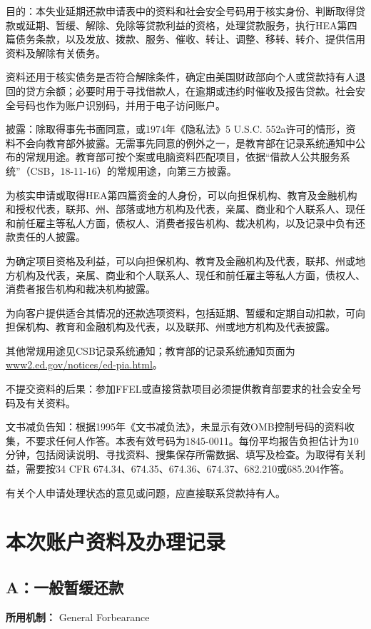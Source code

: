 \documentclass[UTF8,fontset=none,11pt,a4paper]{ctexart}
\begin{document}
目的：本失业延期还款申请表中的资料和社会安全号码用于核实身份、判断取得贷款或延期、暂缓、解除、免除等贷款利益的资格，处理贷款服务，执行HEA第四篇债务条款，以及发放、拨款、服务、催收、转让、调整、移转、转介、提供信用资料及解除有关债务。


资料还用于核实债务是否符合解除条件，确定由美国财政部向个人或贷款持有人退回的贷方余额；必要时用于寻找借款人，在逾期或违约时催收及报告贷款。社会安全号码也作为账户识别码，并用于电子访问账户。


披露：除取得事先书面同意，或1974年《隐私法》5 U.S.C. 552a许可的情形，资料不会向教育部外披露。无需事先同意的例外之一，是教育部在记录系统通知中公布的常规用途。教育部可按个案或电脑资料匹配项目，依据“借款人公共服务系统”（CSB，18-11-16）的常规用途，向第三方披露。


为核实申请或取得HEA第四篇资金的人身份，可以向担保机构、教育及金融机构和授权代表，联邦、州、部落或地方机构及代表，亲属、商业和个人联系人、现任和前任雇主等私人方面，债权人、消费者报告机构、裁决机构，以及记录中负有还款责任的人披露。


为确定项目资格及利益，可以向担保机构、教育及金融机构及代表，联邦、州或地方机构及代表，亲属、商业和个人联系人、现任和前任雇主等私人方面，债权人、消费者报告机构和裁决机构披露。


为向客户提供适合其情况的还款选项资料，包括延期、暂缓和定期自动扣款，可向担保机构、教育和金融机构及代表，以及联邦、州或地方机构及代表披露。


其他常规用途见CSB记录系统通知；教育部的记录系统通知页面为\url{www2.ed.gov/notices/ed-pia.html}。


不提交资料的后果：参加FFEL或直接贷款项目必须提供教育部要求的社会安全号码及有关资料。


文书减负告知：根据1995年《文书减负法》，未显示有效OMB控制号码的资料收集，不要求任何人作答。本表有效号码为1845-0011。每份平均报告负担估计为10分钟，包括阅读说明、寻找资料、搜集保存所需数据、填写及检查。为取得有关利益，需要按34 CFR 674.34、674.35、674.36、674.37、682.210或685.204作答。


有关个人申请处理状态的意见或问题，应直接联系贷款持有人。


\section*{本次账户资料及办理记录}
\subsection*{A：一般暂缓还款}
\textbf{所用机制：} General Forbearance
\end{document}
